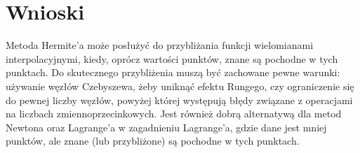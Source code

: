 \documentclass{article}
\begin{document}
\section{Wnioski}
Metoda Hermite'a może posłużyć do przybliżania funkcji wielomianami interpolacyjnymi, kiedy, oprócz wartości punktów, znane
są pochodne w tych punktach. Do skutecznego przybliżenia muszą być zachowane pewne warunki: używanie węzłów Czebyszewa, żeby
uniknąć efektu Rungego, czy ograniczenie się do pewnej liczby węzłów, powyżej której występują błędy związane z operacjami
na liczbach zmiennoprzecinkowych. Jest również dobrą alternatywą dla metod Newtona oraz Lagrange'a w zagadnieniu Lagrange'a, gdzie dane jest mniej punktów, ale 
znane (lub przybliżone) są pochodne w tych punktach. 
\end{document}
